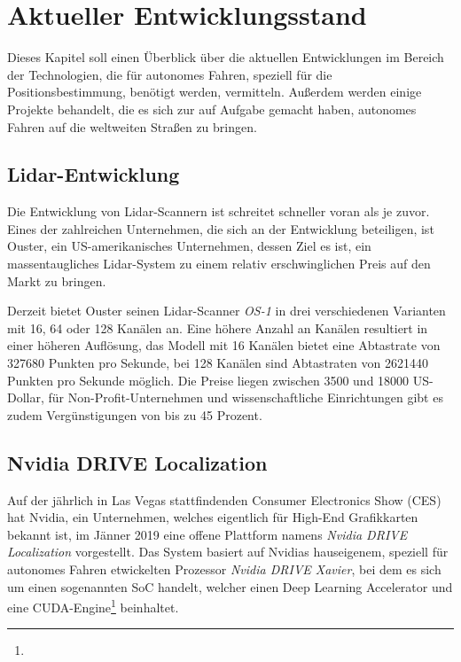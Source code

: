 \chapter{Aktueller Entwicklungsstand}

Dieses Kapitel soll einen Überblick über die aktuellen Entwicklungen im Bereich der Technologien, die für autonomes Fahren, speziell für die Positionsbestimmung, benötigt werden, vermitteln. Außerdem werden einige Projekte behandelt, die es sich zur auf Aufgabe gemacht haben, autonomes Fahren auf die weltweiten Straßen zu bringen.


\section{\acs{Lidar}-Entwicklung}

Die Entwicklung von Lidar-Scannern ist schreitet schneller voran als je zuvor. Eines der zahlreichen Unternehmen, die sich an der Entwicklung beteiligen, ist Ouster, ein US-amerikanisches Unternehmen, dessen Ziel es ist, ein massentaugliches Lidar-System zu einem relativ erschwinglichen Preis auf den Markt zu bringen. 

Derzeit bietet Ouster seinen \acs{Lidar}-Scanner \emph{OS-1} in drei verschiedenen Varianten mit 16, 64 oder 128 Kanälen an. Eine höhere Anzahl an Kanälen resultiert in einer höheren Auflösung, das Modell mit 16 Kanälen bietet eine Abtastrate von \num{327680} Punkten pro Sekunde, bei 128 Kanälen sind Abtastraten von \num{2621440} Punkten pro Sekunde möglich. Die Preise liegen zwischen \num{3500} und \num{18000} US-Dollar, für Non-Profit-Unternehmen und wissenschaftliche Einrichtungen gibt es zudem Vergünstigungen von bis zu 45 Prozent. 


\section{Nvidia DRIVE Localization}

Auf der jährlich in Las Vegas stattfindenden Consumer Electronics Show (CES) hat Nvidia, ein Unternehmen, welches eigentlich für High-End Grafikkarten bekannt ist, im Jänner 2019 eine offene Plattform namens \emph{Nvidia DRIVE Localization} vorgestellt. Das System basiert auf Nvidias hauseigenem, speziell für autonomes Fahren etwickelten Prozessor \emph{Nvidia DRIVE Xavier}, bei dem es sich um einen sogenannten \ac{SoC} handelt, welcher einen Deep Learning Accelerator und eine CUDA-Engine\footnote{} beinhaltet. 

